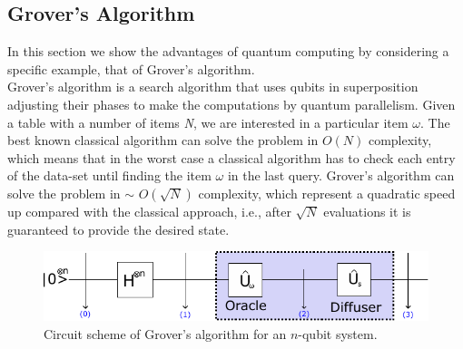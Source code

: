 \subsection{Grover's Algorithm}
In this section we show the advantages of quantum computing by considering a specific example, that of Grover's algorithm.\\
Grover's algorithm is a search algorithm that uses qubits in superposition adjusting their phases to make the computations by quantum parallelism. Given a table with a number of items \textit{N}, we are interested in a particular item $\omega$. The best known classical algorithm can solve the problem in $O(N)$ complexity, which means that in the worst case a classical algorithm has to check each entry of the data-set until finding the item $\omega$ in the last query. Grover's algorithm can solve the problem in $\sim$ $O(\sqrt{N})$ complexity, which represent a quadratic speed up compared with the classical approach, i.e., after $\sqrt{N}$ evaluations it is guaranteed to provide the desired state.
\begin{figure}[H]
    \includegraphics[width=\textwidth]{Figures/Grover_Circuit.pdf}
    \caption{Circuit scheme of Grover's algorithm for an $n$-qubit system.}
    \label{fig:Grover_circuit}
\end{figure}
